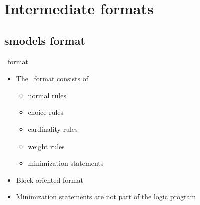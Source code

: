\section{Intermediate formats}
\subsection{smodels format}
\begin{frame}{\smodels\ format}
  \begin{itemize}
  \item The \smodels\ format consists of
    \begin{itemize}
    \item normal rules
    \item choice rules
    \item cardinality rules
    \item weight rules
    \item minimization statements
    \end{itemize}
  \item Block-oriented format
  \item<2->  Minimization statements are not part of the logic program
  \end{itemize}
\end{frame}
